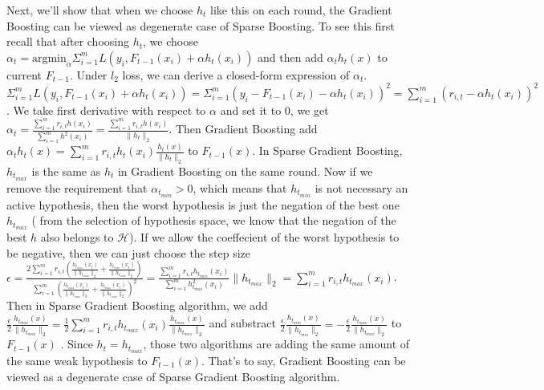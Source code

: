 \documentclass{article} %
\begin{document}
Next, we'll show that when we choose $h_t$ like this on each round, the Gradient Boosting can be viewed as degenerate case of Sparse Boosting. To see this first recall that  after choosing $h_t$, we choose $\alpha_t = \text{argmin}_\alpha \Sigma_{i=1}^{m}L(y_i,F_{t-1}(x_i)+\alpha h_t(x_i))$ and then add $\alpha_t h_t(x)$ to current $F_{t-1}$. Under $l_2$ loss, we can derive a closed-form expression of $\alpha_t$. $\Sigma_{i=1}^{m}L(y_i,F_{t-1}(x_i)+\alpha h_t(x_i))= \Sigma_{i=1}^m(y_i-F_{t-1}(x_i)-\alpha h_t(x_i))^2=\sum_{i=1}^m (r_{i,t}-\alpha h_t(x_i))^2$. We take first derivative with respect to $\alpha$ and set it to $0$,  we get $\alpha_t= \frac{\sum_{i=1}^m r_{i,t} h(x_i)}{\sum_{i=1}^m h^2(x_i)}=\frac{\sum_{i=1}^m r_{i,t} h(x_i)}{\|h_t\|_2}$.  Then Gradient Boosting add $\alpha_t h_t(x)= \sum_{i=1}^m r_{i,t} h_{t}(x_i) \frac{h_t(x)}{\|h_t\|_2}$ to $F_{t-1}(x)$. In Sparse Gradient Boosting, $h_{t_{max}}$ is the same as $h_t$ in Gradient Boosting on the same round. Now if we remove the requirement that $\alpha_{t_{min}}>0$, which means that $h_{t_{min}}$ is not necessary an active hypothesis, then the worst hypothesis is just the negation of the best one $h_{t_{max}}$ ( from the selection of hypothesis space, we know that the negation of the best $h$ also belongs to $\mathcal{H}$). If we allow the coeffecient of the worst hypothesis to be negative, then we can just choose the step size $\epsilon = \frac{2\sum_{i=1}^{m}r_{i,t}  (\frac{h_{t_{max}}(x_{i})}  {\| h_{t_{max}}\|_2}  + \frac{h_{t_{max}}(x_{i})} {\| h_{t_{max}}\|_2} )}{\sum_{i=1}^{m}(  \frac{h_{t_{max}}(x_{i})} {\| h_{t_{max}}\|_2}+\frac{h_{t_{max}}(x_{i})} {\| h_{t_{max}}\|_2})^{2}}= \frac{\sum_{i=1}^m r_{i,t} h_{t_{max}}(x_i)}{\sum_{i=1}^m h_{t_{max}}^2(x_i)} \|h_{t_{max}}\|_2={\sum_{i=1}^m r_{i,t} h_{t_{max}}(x_i)}$. Then in Sparse Gradient Boosting algorithm, we add $\frac{\epsilon}{2} \frac{h_{t_{max}}(x)}{\|h_{t_{max}}\|_2}= \frac{1}{2}\sum_{i=1}^m r_{i,t} h_{t_{max}}(x_i)  \frac{h_{t_{max}}(x)}{\|h_{t_{max}}\|_2}$  and substract $\frac{\epsilon}{2} \frac{h_{t_{min}}(x)}{\|h_{t_{min}}\|_2}= -\frac{\epsilon}{2} \frac{h_{t_{max}}(x)}{\|h_{t_{max}}\|_2}$ to $F_{t-1}(x)$ . Since $h_t=h_{t_{max}}$, those two algorithms are adding the same amount of the same weak hypothesis to $F_{t-1}(x)$. That's to say,  Gradient Boosting can be viewed as a degenerate case of Sparse Gradient Boosting algorithm.
\end{document}
